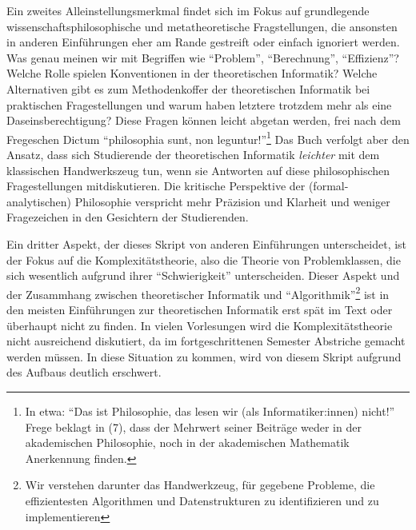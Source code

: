Ein zweites Alleinstellungsmerkmal findet sich im Fokus auf grundlegende
wissenschaftsphilosophische und metatheoretische Fragstellungen,
die ansonsten in anderen Einführungen eher am Rande gestreift
oder einfach ignoriert werden.
Was genau meinen wir mit Begriffen wie ``Problem'', ``Berechnung'', ``Effizienz''?
Welche Rolle spielen Konventionen in der theoretischen Informatik?
Welche Alternativen gibt es zum Methodenkoffer der theoretischen Informatik
bei praktischen Fragestellungen
und warum haben letztere trotzdem mehr als eine Daseinsberechtigung?
Diese Fragen können leicht abgetan werden, frei nach dem Fregeschen Dictum
``philosophia sunt, non leguntur!''\footnote{
    In etwa: ``Das ist Philosophie,
    das lesen wir (als Informatiker:innen) nicht!''
    Frege beklagt in \cite{frege_grundgesetze} (7),
    dass der Mehrwert seiner Beiträge weder in der akademischen Philosophie,
    noch in der akademischen Mathematik Anerkennung finden.
}
Das Buch verfolgt aber den Ansatz,
dass sich Studierende der theoretischen Informatik
\emph {leichter} mit dem klassischen Handwerkszeug tun,
wenn sie Antworten auf diese philosophischen Fragestellungen mitdiskutieren.
Die kritische Perspektive der (formal-analytischen) Philosophie
verspricht mehr Präzision und Klarheit
und weniger Fragezeichen in den Gesichtern der Studierenden.

Ein dritter Aspekt, der dieses Skript von anderen Einführungen unterscheidet,
ist der Fokus auf die Komplexitätstheorie,
also die Theorie von Problemklassen,
die sich wesentlich aufgrund ihrer ``Schwierigkeit'' unterscheiden.
Dieser Aspekt und der Zusammhang zwischen theoretischer Informatik und ``Algorithmik''\footnote{
    Wir verstehen darunter das Handwerkzeug, für gegebene Probleme,
    die effizientesten Algorithmen und Datenstrukturen zu identifizieren 
    und zu implementieren}
ist in den meisten Einführungen zur theoretischen Informatik
erst spät im Text oder überhaupt nicht zu finden.
In vielen Vorlesungen wird die Komplexitätstheorie nicht ausreichend diskutiert, 
da im fortgeschrittenen Semester Abstriche gemacht werden müssen.
In diese Situation zu kommen, wird von diesem Skript aufgrund des Aufbaus deutlich erschwert.

